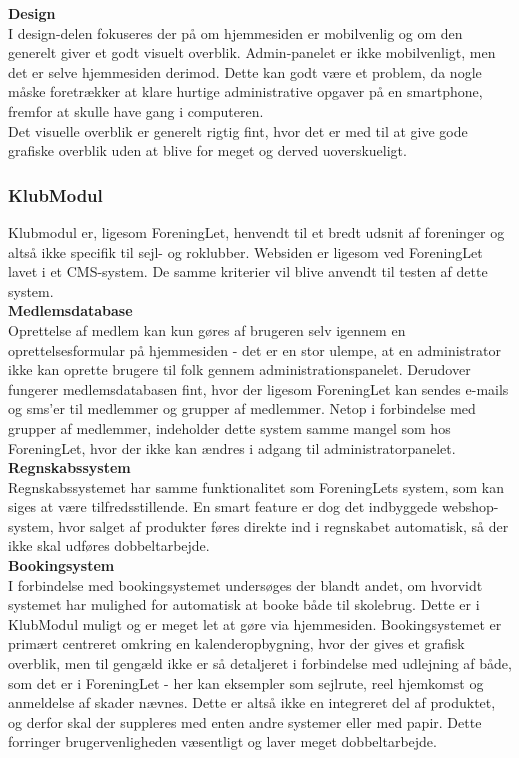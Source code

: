 {\bf Design}\\
I design-delen fokuseres der på om hjemmesiden er mobilvenlig og om den generelt giver et godt visuelt overblik. Admin-panelet er ikke mobilvenligt, men det er selve hjemmesiden derimod. Dette kan godt være et problem, da nogle måske foretrækker at klare hurtige administrative opgaver på en smartphone, fremfor at skulle have gang i computeren.\\

Det visuelle overblik er generelt rigtig fint, hvor det er med til at give gode grafiske overblik uden at blive for meget og derved uoverskueligt.

\subsubsection{KlubModul}
Klubmodul er, ligesom ForeningLet, henvendt til et bredt udsnit af foreninger og altså ikke specifik til sejl- og roklubber. Websiden er ligesom ved ForeningLet lavet i et CMS-system. De samme kriterier vil blive anvendt til testen af dette system.\\

{\bf Medlemsdatabase}\\
Oprettelse af medlem kan kun gøres af brugeren selv igennem en oprettelsesformular på hjemmesiden - det er en stor ulempe, at en administrator ikke kan oprette brugere til folk gennem administrationspanelet. Derudover fungerer medlemsdatabasen fint, hvor der ligesom ForeningLet kan sendes e-mails og sms'er til medlemmer og grupper af medlemmer. Netop i forbindelse med grupper af medlemmer, indeholder dette system samme mangel som hos ForeningLet, hvor der ikke kan ændres i adgang til administratorpanelet.\\

{\bf Regnskabssystem}\\
Regnskabssystemet har samme funktionalitet som ForeningLets system, som kan siges at være tilfredsstillende. En smart feature er dog det indbyggede webshop-system, hvor salget af produkter føres direkte ind i regnskabet automatisk, så der ikke skal udføres dobbeltarbejde.\\

{\bf Bookingsystem}\\
I forbindelse med bookingsystemet undersøges der blandt andet, om hvorvidt systemet har mulighed for automatisk at booke både til skolebrug. Dette er i KlubModul muligt og er meget let at gøre via hjemmesiden. Bookingsystemet er primært centreret omkring en kalenderopbygning, hvor der gives et grafisk overblik, men til gengæld ikke er så detaljeret i forbindelse med udlejning af både, som det er i ForeningLet - her kan eksempler som sejlrute, reel hjemkomst og anmeldelse af skader nævnes. Dette er altså ikke en integreret del af produktet, og derfor skal der suppleres med enten andre systemer eller med papir. Dette forringer brugervenligheden væsentligt og laver meget dobbeltarbejde.\\


